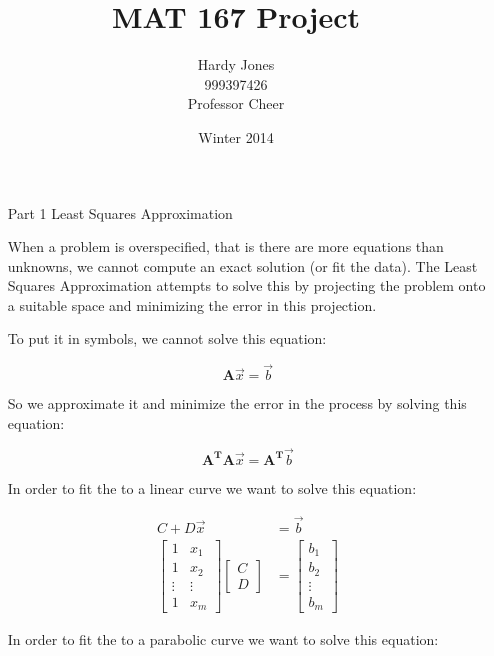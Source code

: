 \documentclass[12pt,letterpaper]{article}
\title{MAT 167 Project\vspace{-2ex}}
\author{Hardy Jones\\
        999397426\\
        Professor Cheer\vspace{-2ex}}
\date{Winter 2014}
\begin{document}
  \maketitle

  \begin{enumerate}
    \item[Part 1] Least Squares Approximation

      When a problem is overspecified, that is there are more equations than unknowns, we cannot compute an exact solution (or fit the data).
      The Least Squares Approximation attempts to solve this by projecting the problem onto a suitable space and minimizing the error in this projection.

      To put it in symbols, we cannot solve this equation:

      \[\mathbf{A}\vec{x} = \vec{b}\]

      So we approximate it and minimize the error in the process by solving this equation:

      \[\mathbf{A^T}\mathbf{A}\vec{x} = \mathbf{A^T}\vec{b}\]

      In order to fit the to a linear curve we want to solve this equation:

      \begin{align*}
        C + D\vec{x} &= \vec{b} \\
        \begin{bmatrix}
          1 & x_1 \\
          1 & x_2 \\
          \vdots & \vdots \\
          1 & x_m
        \end{bmatrix}
        \begin{bmatrix}
          C \\
          D
        \end{bmatrix}
        &=
        \begin{bmatrix}
          b_1 \\
          b_2 \\
          \vdots \\
          b_m
        \end{bmatrix}
      \end{align*}

      In order to fit the to a parabolic curve we want to solve this equation:


\end{enumerate}
\end{document}
